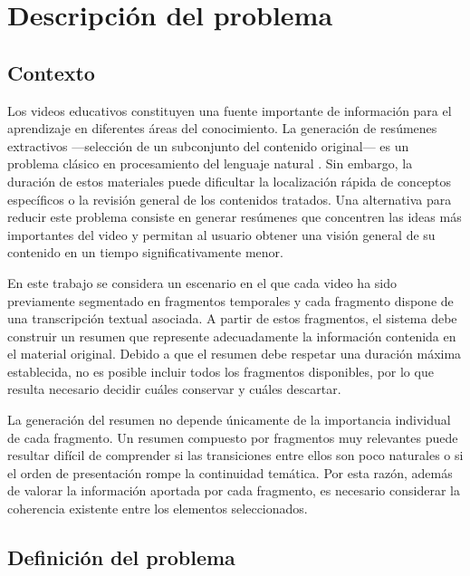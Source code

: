 \documentclass[12pt,a4paper]{article}
\begin{document}

\section{Descripción del problema}

\subsection{Contexto}

Los videos educativos constituyen una fuente importante de información para el aprendizaje en diferentes áreas del conocimiento. La generación de resúmenes extractivos ---selección de un subconjunto del contenido original--- es un problema clásico en procesamiento del lenguaje natural \cite{nenkova2011}. Sin embargo, la duración de estos materiales puede dificultar la localización rápida de conceptos específicos o la revisión general de los contenidos tratados. Una alternativa para reducir este problema consiste en generar resúmenes que concentren las ideas más importantes del video y permitan al usuario obtener una visión general de su contenido en un tiempo significativamente menor.

En este trabajo se considera un escenario en el que cada video ha sido previamente segmentado en fragmentos temporales y cada fragmento dispone de una transcripción textual asociada. A partir de estos fragmentos, el sistema debe construir un resumen que represente adecuadamente la información contenida en el material original. Debido a que el resumen debe respetar una duración máxima establecida, no es posible incluir todos los fragmentos disponibles, por lo que resulta necesario decidir cuáles conservar y cuáles descartar.

La generación del resumen no depende únicamente de la importancia individual de cada fragmento. Un resumen compuesto por fragmentos muy relevantes puede resultar difícil de comprender si las transiciones entre ellos son poco naturales o si el orden de presentación rompe la continuidad temática. Por esta razón, además de valorar la información aportada por cada fragmento, es necesario considerar la coherencia existente entre los elementos seleccionados.

\subsection{Definición del problema}
\end{document}
